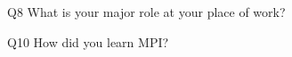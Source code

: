 \begin{description}%
\item{Q8} What is your major role at your place of work?%
\item{Q10} How did you learn MPI?%
\end{description}%

